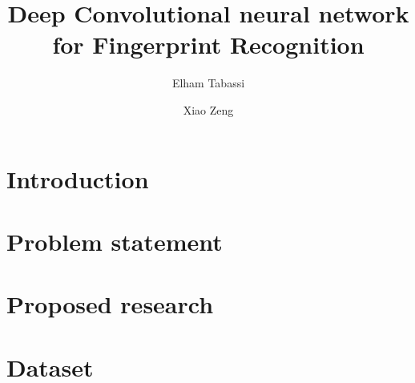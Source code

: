 \documentclass[10pt,twocolumn,letterpaper]{article}
\begin{document}
\title{Deep Convolutional neural network for Fingerprint Recognition}

\author{Elham Tabassi \and Xiao Zeng \\}

\maketitle


%

\section{Introduction}




%

\section{Problem statement}


\section{Proposed research}




\section{Dataset}









{\small


}
\end{document}
